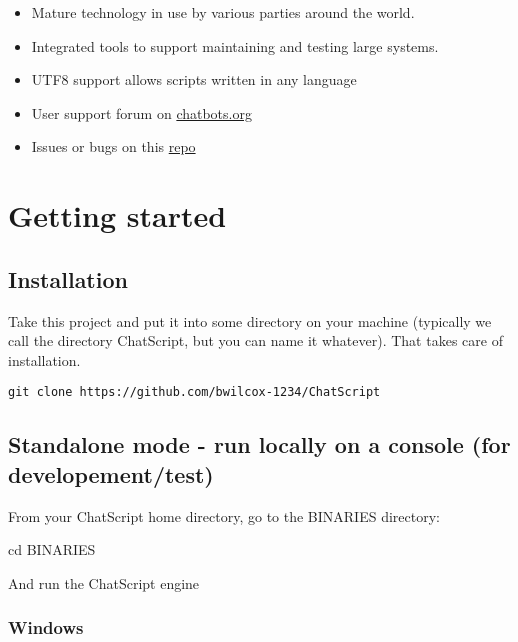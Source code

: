 \documentclass[]{article}
\newenvironment{Shaded}{}{}
\newcommand{\BuiltInTok}[1]{#1}
\newcommand{\NormalTok}[1]{#1}
\providecommand{\tightlist}{%
  \setlength{\itemsep}{0pt}\setlength{\parskip}{0pt}}
\begin{document}
\begin{itemize}
\tightlist
\item
  Mature technology in use by various parties around the world.
\item
  Integrated tools to support maintaining and testing large systems.
\item
  UTF8 support allows scripts written in any language
\item
  User support forum on
  \href{https://www.chatbots.org/ai_zone/viewforum/44/}{chatbots.org}
\item
  Issues or bugs on this
  \href{https://github.com/bwilcox-1234/ChatScript/issues}{repo}
\end{itemize}

\section{Getting started}\label{getting-started}

\subsection{Installation}\label{installation}

Take this project and put it into some directory on your machine
(typically we call the directory ChatScript, but you can name it
whatever). That takes care of installation.

\begin{verbatim}
git clone https://github.com/bwilcox-1234/ChatScript
\end{verbatim}

\subsection{Standalone mode - run locally on a console (for
developement/test)}\label{standalone-mode---run-locally-on-a-console-for-developementtest}

From your ChatScript home directory, go to the BINARIES directory:

\begin{Shaded}
\begin{Highlighting}[]
\BuiltInTok{cd}\NormalTok{ BINARIES}
\end{Highlighting}
\end{Shaded}

And run the ChatScript engine

\subsubsection{Windows}\label{windows}
\end{document}
